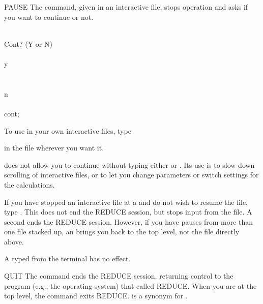 \begin{Command}{PAUSE}
The  command, given in an interactive file, stops operation and
asks if you want to continue or not.

\begin{Examples}
 \\
				   Cont? (Y or N) \\
 \\
y\\
 \\
 \\
n \\
 \\
cont; \\
\end{Examples}

To use  in your own interactive files, type



in the file wherever you want it.


\begin{Comments}
 does not allow you to continue without typing either 
or .  Its use is to slow down scrolling of interactive files, or to
let you change parameters or switch settings for the calculations.

If you have stopped an interactive file at a  and do not wish to
resume the file, type .  This does not end the REDUCE session, but
stops input from the file.  A second  ends the REDUCE session.
However, if you have pauses from more than one file stacked up, an 
brings you back to the top level, not the file directly above.

A  typed from the terminal has no effect.
\end{Comments}
\end{Command}


\begin{Command}{QUIT}
The  command ends the REDUCE session, returning control to the
program (e.g., the operating system) that called REDUCE.  When you are at
the top level, the  command exits REDUCE.  is a
synonym for .

\end{Command}


